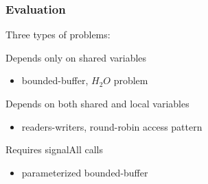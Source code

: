 \documentclass[mathserif,14pt,xcolor=table]{beamer}
\begin{document}
\begin{frame}
    \frametitle{Evaluation}
    Three types of problems:
    \begin{description}[labelwidth=\widthof{Complex}]
        \item[Shared predicate] Depends only on shared variables
            \begin{itemize}
                \item bounded-buffer, $H_2O$ problem  
            \end{itemize}
        \item[Complex predicate] Depends on both shared and local variables 
            \begin{itemize}
                \item readers-writers, round-robin access pattern
            \end{itemize}
        \item[signalAll] Requires signalAll calls
            \begin{itemize}
                \item parameterized bounded-buffer
            \end{itemize}
    \end{description}
\end{frame}
\end{document}
